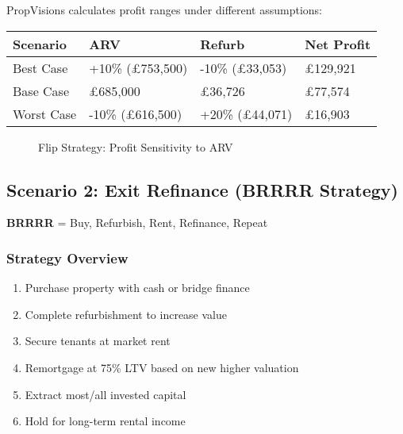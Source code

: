 \documentclass[11pt,a4paper]{article}
\begin{document}
PropVisions calculates profit ranges under different assumptions:

\begin{longtable}{@{}p{4cm}p{3cm}p{3cm}p{4cm}@{}}
\toprule
\textbf{Scenario} & \textbf{ARV} & \textbf{Refurb} & \textbf{Net Profit} \\
\midrule
Best Case & +10\% (£753,500) & -10\% (£33,053) & £129,921 \\
Base Case & £685,000 & £36,726 & £77,574 \\
Worst Case & -10\% (£616,500) & +20\% (£44,071) & £16,903 \\
\bottomrule
\end{longtable}

\begin{figure}[H]
\centering
{}
\caption{Flip Strategy: Profit Sensitivity to ARV}
\end{figure}

\subsection{Scenario 2: Exit Refinance (BRRRR Strategy)}

\textbf{BRRRR} = Buy, Refurbish, Rent, Refinance, Repeat

\subsubsection{Strategy Overview}

\begin{enumerate}
  \item Purchase property with cash or bridge finance
  \item Complete refurbishment to increase value
  \item Secure tenants at market rent
  \item Remortgage at 75\% LTV based on new higher valuation
  \item Extract most/all invested capital
  \item Hold for long-term rental income
\end{enumerate}
\end{document}

